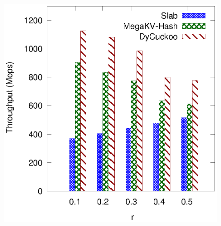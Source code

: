 \begin{figure}[htp]
\begin{minipage}{0.19\linewidth}
		\centerline{\dsali}
	\end{minipage}
	\begin{minipage}{0.19\linewidth}\centering
		\includegraphics[width=\linewidth]{pic/dynamic/r/dynamic_random.eps}
		\centerline{\dsrandom}
	\end{minipage}
	\caption{}
	\label{fig:vary-r-time}
\end{figure}
%
